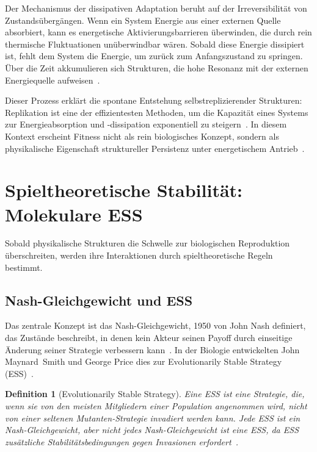 \documentclass[12pt,a4paper]{article}
\newtheorem{definition}{Definition}
\theoremstyle{remark}
\begin{document}
Der Mechanismus der dissipativen Adaptation beruht auf der Irreversibilität von Zustandsübergängen. Wenn ein System Energie aus einer externen Quelle absorbiert, kann es energetische Aktivierungsbarrieren überwinden, die durch rein thermische Fluktuationen unüberwindbar wären. Sobald diese Energie dissipiert ist, fehlt dem System die Energie, um zurück zum Anfangszustand zu springen. Über die Zeit akkumulieren sich Strukturen, die hohe Resonanz mit der externen Energiequelle aufweisen~\citep{EnglandNano}.

Dieser Prozess erklärt die spontane Entstehung selbstreplizierender Strukturen: Replikation ist eine der effizientesten Methoden, um die Kapazität eines Systems zur Energieabsorption und -dissipation exponentiell zu steigern~\citep{EnglandNano}. In diesem Kontext erscheint \glqq Fitness\grqq{} nicht als rein biologisches Konzept, sondern als physikalische Eigenschaft struktureller Persistenz unter energetischem Antrieb~\citep{England2013}.

\section{Spieltheoretische Stabilität: Molekulare ESS}
\label{sec:molecular}

Sobald physikalische Strukturen die Schwelle zur biologischen Reproduktion überschreiten, werden ihre Interaktionen durch spieltheoretische Regeln bestimmt.

\subsection{Nash-Gleichgewicht und ESS}

Das zentrale Konzept ist das Nash-Gleichgewicht, 1950 von John Nash definiert, das Zustände beschreibt, in denen kein Akteur seinen Payoff durch einseitige Änderung seiner Strategie verbessern kann~\citep{NashPNAS,NashSFI}. In der Biologie entwickelten John Maynard~Smith und George Price dies zur Evolutionarily Stable Strategy (ESS)~\citep{MaynardSmithPrice1973,MaynardSmith1982}.

\begin{definition}[Evolutionarily Stable Strategy]
Eine ESS ist eine Strategie, die, wenn sie von den meisten Mitgliedern einer Population angenommen wird, nicht von einer seltenen Mutanten-Strategie invadiert werden kann. Jede ESS ist ein Nash-Gleichgewicht, aber nicht jedes Nash-Gleichgewicht ist eine ESS, da ESS zusätzliche Stabilitätsbedingungen gegen Invasionen erfordert~\citep{MaynardSmith1982}.
\end{definition}
\end{document}
